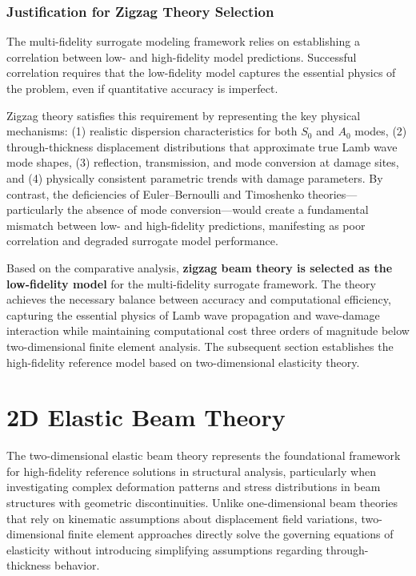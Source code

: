\documentclass[12pt,a4paper]{report}
\begin{document}
\subsubsection{Justification for Zigzag Theory Selection}

The multi-fidelity surrogate modeling framework relies on establishing a correlation between low- and high-fidelity model predictions. Successful correlation requires that the low-fidelity model captures the essential physics of the problem, even if quantitative accuracy is imperfect.

Zigzag theory satisfies this requirement by representing the key physical mechanisms: (1) realistic dispersion characteristics for both $S_0$ and $A_0$ modes, (2) through-thickness displacement distributions that approximate true Lamb wave mode shapes, (3) reflection, transmission, and mode conversion at damage sites, and (4) physically consistent parametric trends with damage parameters. By contrast, the deficiencies of Euler--Bernoulli and Timoshenko theories—particularly the absence of mode conversion—would create a fundamental mismatch between low- and high-fidelity predictions, manifesting as poor correlation and degraded surrogate model performance.

Based on the comparative analysis, \textbf{zigzag beam theory is selected as the low-fidelity model} for the multi-fidelity surrogate framework. The theory achieves the necessary balance between accuracy and computational efficiency, capturing the essential physics of Lamb wave propagation and wave-damage interaction while maintaining computational cost three orders of magnitude below two-dimensional finite element analysis. The subsequent section establishes the high-fidelity reference model based on two-dimensional elasticity theory.







\section{2D Elastic Beam Theory}
\label{sec:2d_elastic_theory}

The two-dimensional elastic beam theory represents the foundational framework for high-fidelity reference solutions in structural analysis, particularly when investigating complex deformation patterns and stress distributions in beam structures with geometric discontinuities. Unlike one-dimensional beam theories that rely on kinematic assumptions about displacement field variations, two-dimensional finite element approaches directly solve the governing equations of elasticity without introducing simplifying assumptions regarding through-thickness behavior.
\end{document}
